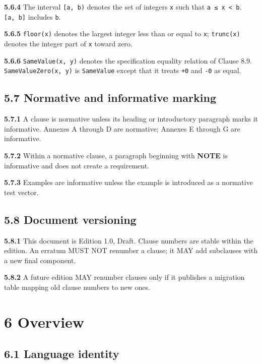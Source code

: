 \documentclass[
  english,
  11pt,
  a4paper,
]{article}
\begin{document}
\textbf{5.6.4} The interval \texttt{{[}a,\ b)} denotes the set of
integers \texttt{x} such that \texttt{a\ ≤\ x\ \textless{}\ b}.
\texttt{{[}a,\ b{]}} includes \texttt{b}.

\textbf{5.6.5} \texttt{floor(x)} denotes the largest integer less than
or equal to \texttt{x}; \texttt{trunc(x)} denotes the integer part of
\texttt{x} toward zero.

\textbf{5.6.6} \texttt{SameValue(x,\ y)} denotes the specification
equality relation of Clause 8.9. \texttt{SameValueZero(x,\ y)} is
\texttt{SameValue} except that it treats \texttt{+0} and \texttt{-0} as
equal.

\subsection{5.7 Normative and informative
marking}\label{normative-and-informative-marking}

\textbf{5.7.1} A clause is normative unless its heading or introductory
paragraph marks it informative. Annexes A through D are normative;
Annexes E through G are informative.

\textbf{5.7.2} Within a normative clause, a paragraph beginning with
\textbf{NOTE} is informative and does not create a requirement.

\textbf{5.7.3} Examples are informative unless the example is introduced
as a normative test vector.

\subsection{5.8 Document versioning}\label{document-versioning}

\textbf{5.8.1} This document is Edition 1.0, Draft. Clause numbers are
stable within the edition. An erratum MUST NOT renumber a clause; it MAY
add subclauses with a new final component.

\textbf{5.8.2} A future edition MAY renumber clauses only if it
publishes a migration table mapping old clause numbers to new ones.

\section{6 Overview}\label{overview}

\subsection{6.1 Language identity}\label{language-identity}
\end{document}
